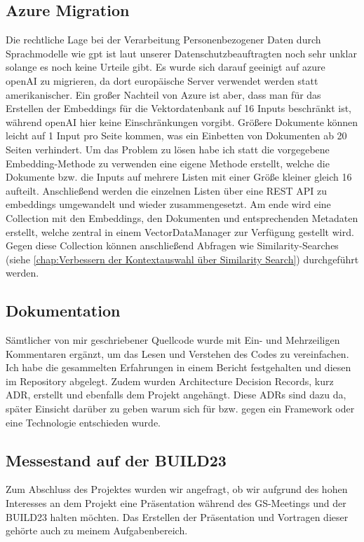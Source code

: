 \subsection{Azure Migration}
Die rechtliche Lage bei der Verarbeitung Personenbezogener Daten durch Sprachmodelle wie gpt ist laut unserer
Datenschutzbeauftragten noch sehr unklar solange es noch keine Urteile gibt. Es wurde sich darauf geeinigt auf azure
openAI zu migrieren, da dort europäische Server verwendet werden statt amerikanischer. Ein großer Nachteil von Azure ist
aber, dass man für das Erstellen der Embeddings für die Vektordatenbank auf 16 Inputs beschränkt ist, während openAI
hier keine Einschränkungen vorgibt. Größere Dokumente können leicht auf 1 Input pro Seite kommen, was ein Einbetten von
Dokumenten ab 20 Seiten verhindert. Um das Problem zu lösen habe ich statt die vorgegebene Embedding-Methode zu
verwenden eine eigene Methode erstellt, welche die Dokumente bzw. die Inputs auf mehrere Listen mit einer Größe kleiner
gleich 16 aufteilt. Anschließend werden die einzelnen Listen über eine REST API zu embeddings umgewandelt und wieder
zusammengesetzt. Am ende wird eine Collection mit den Embeddings, den Dokumenten und entsprechenden Metadaten erstellt,
welche zentral in einem VectorDataManager zur Verfügung gestellt wird. Gegen diese Collection können anschließend
Abfragen wie Similarity-Searches (siehe \ref{chap:Verbessern der Kontextauswahl über Similarity Search}) durchgeführt
werden.

\subsection{Dokumentation}
Sämtlicher von mir geschriebener Quellcode wurde mit Ein- und Mehrzeiligen Kommentaren ergänzt, um das Lesen und
Verstehen des Codes zu vereinfachen. Ich habe die gesammelten Erfahrungen in einem Bericht festgehalten und diesen im
Repository abgelegt. Zudem wurden Architecture Decision Records, kurz ADR, erstellt und ebenfalls dem Projekt angehängt.
Diese ADRs sind dazu da, später Einsicht darüber zu geben warum sich für bzw. gegen ein Framework oder eine Technologie
entschieden wurde.

\subsection{Messestand auf der BUILD23}

Zum Abschluss des Projektes wurden wir angefragt, ob wir aufgrund des hohen Interesses an dem Projekt eine Präsentation
während des GS-Meetings und der BUILD23 halten möchten. Das Erstellen der Präsentation und Vortragen dieser gehörte auch
zu meinem Aufgabenbereich.


